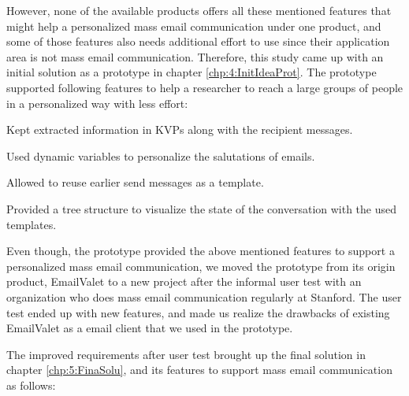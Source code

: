 However, none of the available products offers all these mentioned features that might help a personalized mass email communication under one product, and some of those features also needs additional effort to use since their application area is not mass email communication. Therefore, this study came up with an initial solution as a prototype in chapter \ref{chp:4:InitIdeaProt}. The prototype supported following features to help a researcher to reach a large groups of people in a personalized way with less effort:

\begin{compactitem}
	\item Kept extracted information in \ac{KVP}s along with the recipient messages.
	\item Used dynamic variables to personalize the salutations of emails.
	\item Allowed to reuse earlier send messages as a template.
	\item Provided a tree structure to visualize the state of the conversation with the used templates.
\end{compactitem}
\vspace{1cm}

Even though, the prototype provided the above mentioned features to support a personalized mass email communication, we moved the prototype from its origin product, EmailValet to a new project after the informal user test with an organization who does mass email communication regularly at Stanford. The user test ended up with new features, and made us realize the drawbacks of existing EmailValet as a email client that we used in the prototype.
\vspace{1cm}

The improved requirements after user test brought up the final solution in chapter \ref{chp:5:FinaSolu}, and its features to support mass email communication as follows:

